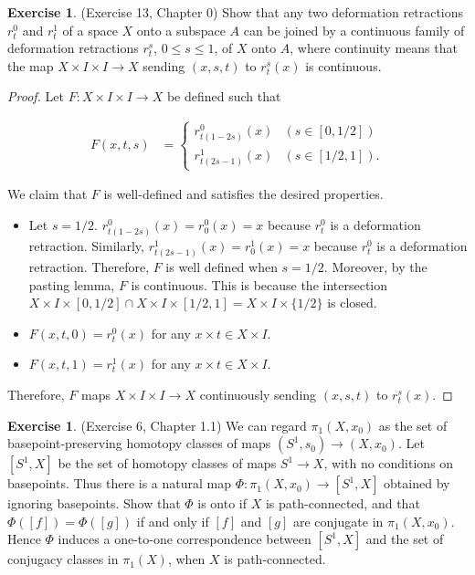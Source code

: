\documentclass[12pt, psamsfonts]{amsart}
\theoremstyle{definition}
\newtheorem{exer}[thm]{Exercise}
\theoremstyle{remark}
\numberwithin{equation}{section}
\begin{document}
\begin{exer}{(Exercise 13, Chapter 0)}
  Show that any two deformation retractions $r_t^0$ and $r_t^1$ of a space $X$ onto a subspace $A$ can be joined by a continuous family of deformation retractions $r^s_t$, $0 \leq s \leq 1$, of $X$ onto $A$, where continuity means that the map $X \times I \times I \rightarrow X$ sending $(x, s, t)$ to $r^s_t(x)$ is continuous.
\end{exer}

\begin{proof}
  Let $F: X \times I \times I \rightarrow X$ be defined such that

  \begin{align*}
    F(x, t, s) &= \begin{cases}
      r_{t(1 - 2s)}^0(x) & (s \in [0, 1/2]) \\
      r_{t(2s - 1)}^1(x) & (s \in [1/2, 1]).
    \end{cases}
  \end{align*}

  We claim that $F$ is well-defined and satisfies the desired properties.

  \begin{itemize}
    \item
      Let $s = 1 / 2$.
      $r_{t(1 - 2s)}^0(x) = r_0^0(x) = x$ because $r^0_t$ is a deformation retraction.
      Similarly, $r_{t(2s - 1)}^1(x) = r_0^1(x) = x$ because $r^0_t$ is a deformation retraction.
      Therefore, $F$ is well defined when $s = 1/2$.
      Moreover, by the pasting lemma, $F$ is continuous.
      This is because the intersection $X \times I \times [0, 1/2] \cap X \times I \times [1/2, 1] = X \times I \times \{ 1/2 \}$ is closed.
    \item
      $F(x, t, 0) = r_t^0(x)$ for any $x \times t \in X \times I$.
    \item
      $F(x, t, 1) = r_t^1(x)$ for any $x \times t \in X \times I$.
  \end{itemize}

  Therefore, $F$ maps $X \times I \times I \rightarrow X$ continuously sending $(x, s, t)$ to $r^s_t(x)$.
\end{proof}

\begin{exer}{(Exercise 6, Chapter 1.1)}
  We can regard $\pi_1(X, x_0)$ as the set of basepoint-preserving homotopy classes of maps $(S^1, s_0) \rightarrow (X, x_0)$.
  Let $[S^1, X]$ be the set of homotopy classes of maps $S^1 \rightarrow X$, with no conditions on basepoints.
  Thus there is a natural map $\Phi: \pi_1(X, x_0) \rightarrow [S^1, X]$ obtained by ignoring basepoints.
  Show that $\Phi$ is onto if $X$ is path-connected, and that $\Phi([f]) = \Phi([g])$ if and only if $[f]$ and $[g]$ are conjugate in $\pi_1(X, x_0)$.
  Hence $\Phi$ induces a one-to-one correspondence between $[S^1, X]$ and the set of conjugacy classes in $\pi_1(X)$, when $X$ is path-connected.
\end{exer}
\end{document}
